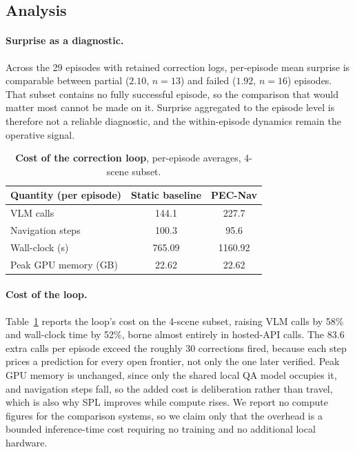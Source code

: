 \subsection{Analysis}
\label{sec:analysis}

\paragraph{Surprise as a diagnostic.} Across the 29 episodes with retained correction logs, per-episode mean surprise is comparable between partial ($2.10$, $n = 13$) and failed ($1.92$, $n = 16$) episodes. That subset contains no fully successful episode, so the comparison that would matter most cannot be made on it. Surprise aggregated to the episode level is therefore not a reliable diagnostic, and the within-episode dynamics remain the operative signal.

\begin{table}[htbp]
\centering
\caption{\textbf{Cost of the correction loop}, per-episode averages, 4-scene subset.}
\label{tab:compute}
\footnotesize
\setlength{\tabcolsep}{3pt}
\begin{tabular}{@{}l|cc@{}}
\toprule
\textbf{Quantity (per episode)} & \textbf{Static baseline} & \textbf{PEC-Nav} \\
\midrule
VLM calls            & 144.1  & 227.7 \\
Navigation steps     & 100.3  & 95.6 \\
Wall-clock (s)       & 765.09 & 1160.92 \\
Peak GPU memory (GB) & 22.62  & 22.62 \\
\bottomrule
\end{tabular}
\end{table}

\paragraph{Cost of the loop.} Table~\ref{tab:compute} reports the loop's cost on the 4-scene subset, raising VLM calls by 58\% and wall-clock time by 52\%, borne almost entirely in hosted-API calls. The 83.6 extra calls per episode exceed the roughly 30 corrections fired, because each step prices a prediction for every open frontier, not only the one later verified. Peak GPU memory is unchanged, since only the shared local QA model occupies it, and navigation steps fall, so the added cost is deliberation rather than travel, which is also why SPL improves while compute rises. We report no compute figures for the comparison systems, so we claim only that the overhead is a bounded inference-time cost requiring no training and no additional local hardware.

